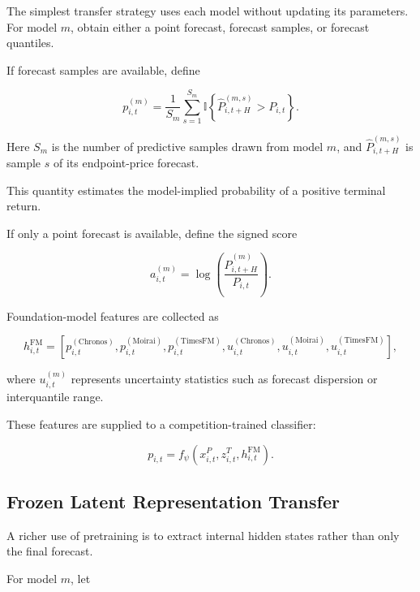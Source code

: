 \documentclass[11pt]{article}
\newcommand{\ind}{\mathbb{I}}
\begin{document}
The simplest transfer strategy uses each model without updating its parameters.
For model $m$, obtain either a point forecast, forecast samples, or forecast
quantiles.

If forecast samples are available, define

\begin{equation}
p^{(m)}_{i,t}
=
\frac{1}{S_m}
\sum_{s=1}^{S_m}
\ind
\left\{
\widehat P^{(m,s)}_{i,t+H}
>
P_{i,t}
\right\}.
\end{equation}

Here $S_m$ is the number of predictive samples drawn from model $m$, and
$\widehat P^{(m,s)}_{i,t+H}$ is sample $s$ of its endpoint-price forecast.

This quantity estimates the model-implied probability of a positive terminal
return.

If only a point forecast is available, define the signed score

\begin{equation}
a^{(m)}_{i,t}
=
\log
\left(
\frac{
\widehat P^{(m)}_{i,t+H}
}{
P_{i,t}
}
\right).
\end{equation}

Foundation-model features are collected as

\begin{equation}
h^{\mathrm{FM}}_{i,t}
=
\left[
p^{(\mathrm{Chronos})}_{i,t},
p^{(\mathrm{Moirai})}_{i,t},
p^{(\mathrm{TimesFM})}_{i,t},
u^{(\mathrm{Chronos})}_{i,t},
u^{(\mathrm{Moirai})}_{i,t},
u^{(\mathrm{TimesFM})}_{i,t}
\right],
\end{equation}

where $u^{(m)}_{i,t}$ represents uncertainty statistics such as forecast
dispersion or interquantile range.

These features are supplied to a competition-trained classifier:

\begin{equation}
p_{i,t}
=
f_\psi
\left(
x^P_{i,t},
z^T_{i,t},
h^{\mathrm{FM}}_{i,t}
\right).
\end{equation}

\subsection{Frozen Latent Representation Transfer}

A richer use of pretraining is to extract internal hidden states rather than
only the final forecast.

For model $m$, let
\end{document}
